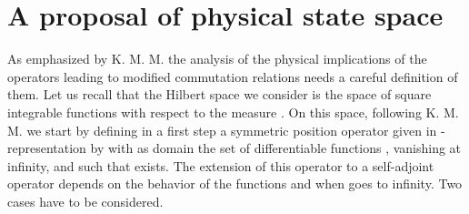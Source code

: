 \documentclass[a4paper,10pt]{article}
\providecommand{\cD}{{\cal D}}
\providecommand{\xp}{i\,f(p)\partial_p}
\providecommand{\KMM}{K. M. M. }
\begin{document}
\section{A proposal of physical state space}
As emphasized by \KMM the analysis of the physical implications of
the operators leading to modified commutation relations needs a
careful definition of them. Let us recall that the Hilbert space
we consider is the space of square integrable functions with
respect to the measure \coordHE{}. On this space, following \KMM we
start by defining in a first step a symmetric position operator
\coordHE{} given in \coordHE{}-representation by \myHighlight{$\xp\phi(p)$}\coordHE{} with as
domain \myHighlight{$\cD({\hat x})$}\coordHE{} the set of differentiable functions \myHighlight{$\phi$}\coordHE{},
vanishing at infinity, and such that
\coordHE{} exists. The
extension of this operator to a self-adjoint operator depends on
the behavior of the functions \coordHE{} and \coordHE{} when \coordHE{} goes to infinity. Two cases have to be considered.
\end{document}
